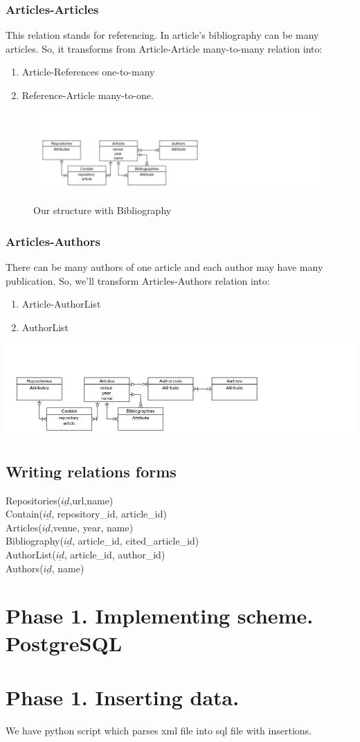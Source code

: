 \documentclass[12pt,a4paper]{article}
\begin{document}
\subsubsection{Articles-Articles}
This relation stands for referencing. In article's bibliography can be many articles. So, it transforms from Article-Article many-to-many relation into:
\begin{enumerate}
\item Article-References one-to-many
\item Reference-Article many-to-one.
\end{enumerate}
\begin{figure}[h]
\includegraphics[scale=0.65791]{media/figure3.jpg}\\
\caption{Our structure with Bibliography}
\end{figure}

\subsubsection{Articles-Authors}
There can be many authors of one article and each author may have many publication. So, we'll transform Articles-Authors relation into:
\begin{enumerate}
\item Article-AuthorList
\item AuthorList
\end{enumerate}
\includegraphics[scale=0.585791]{media/figure4.jpg}

\subsection{Writing relations forms}
Repositories($\underline{id}$,url,name)\\
Contain($\underline{id}$, repository\_id, article\_id)\\
Articles($\underline{id}$,venue, year, name)\\
Bibliography($\underline{id}$, article\_id, cited\_article\_id)\\
AuthorList($\underline{id}$, article\_id, author\_id)\\
Authors($\underline{id}$, name)
\section{Phase 1. Implementing scheme. PostgreSQL}
\section{Phase 1. Inserting data.}
We have python script which parses xml file into sql file with insertions.
\end{document}
